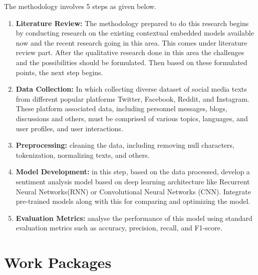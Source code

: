 \documentclass[a4paper,onecolumn,11pt]{article}
\begin{document}
The methodology involves 5 steps as given below.
\begin{enumerate}
  \item \textbf{Literature Review:} The methodology prepared to do this research begins by conducting research on the existing contextual embedded models available now and the recent research going in this area. This comes under literature review part. After the qualitative research done in this area the challenges and the possibilities should be formulated. Then based on these formulated points, the next step begins. 
  \item \textbf{Data Collection:} In which collecting diverse dataset of social media texts from different popular platforms Twitter, Facebook, Reddit, and Instagram. These platform associated data, including personnel messages, blogs, discussions and others, must be comprised of various topics, languages, and user profiles, and user interactions.
  \item \textbf{Preprocessing:}  cleaning the data, including removing null characters, tokenization, normalizing texts, and others. 
  \item \textbf{Model Development:} in this step, based on the data processed, develop a sentiment analysis model based on deep learning architecture like Recurrent Neural Networks(RNN) or Convolutional Neural Networks (CNN). Integrate pre-trained models along with this for comparing and optimizing the model.
\item \textbf{Evaluation Metrics:} analyse the performance of this model using  standard evaluation metrics such as accuracy, precision, recall, and F1-score.
\end{enumerate}


\section{Work Packages}
\end{document}
